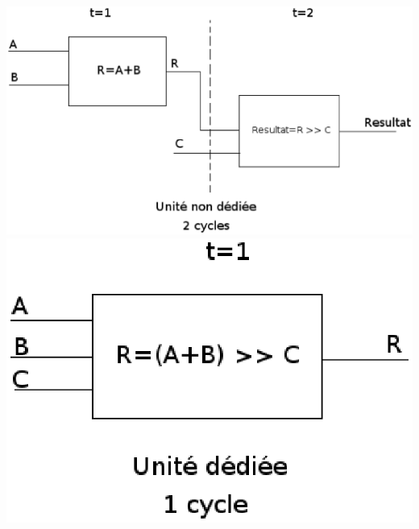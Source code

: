 \begin{center}
\includegraphics[scale=0.4]{bloc2.eps}
\includegraphics[scale=0.4]{bloc1.eps}
\end{center}